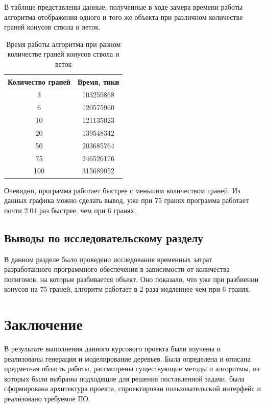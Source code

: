 \documentclass[54pt, a4paper]{article}
\begin{document}
	В таблице представлены данные, полученные в ходе замера времени работы алгоритма отображения одного и того же объекта при различном количестве граней конусов ствола и веток.
	
	\begin{table}[ht!]
		\begin{center}
			\begin{tabular}{ | c | c |}
				\hline
				Количество граней  & Время, тики \\ \hline  
				3 & 103259868\\   
				6 & 120575960\\      
				10 & 121135023\\    
				20 & 139548342\\
				50 & 203685764\\
				75 & 246526176\\
				100 & 315689052\\
				\hline
			\end{tabular}
		\end{center}
		\caption{Время работы алгоритма при разном количестве граней конусов ствола и веток}
	\end{table}

	
	
	Очевидно, программа работает быстрее с меньшим количеством граней. Из данных графика можно сделать вывод, уже при 75 гранях программа работает почти 2.04 раз быстрее, чем при 6 гранях.
	
	\subsection{Выводы по исследовательскому разделу}
	В данном разделе было проведено исследование временных затрат разработанного программного обеспечения в зависимости от количества полигонов, на которые разбивается объект. Оно показало, что уже при разбиении конусов на 75 граней, алгоритм работает в 2 раза медленнее чем при 6 гранях.
	\newpage
	\section*{Заключение}
	В результате выполнения данного курсового проекта были изучены и реализованы генерация и моделирование деревьев. Была определена и описана предметная область работы, рассмотрены существующие методы и алгоритмы, из которых были
	выбраны подходящие для решения поставленной задачи, была сформирована архитектура проекта, спроектирован пользовательский интерфейс и реализовано требуемое ПО.
	
\end{document}

